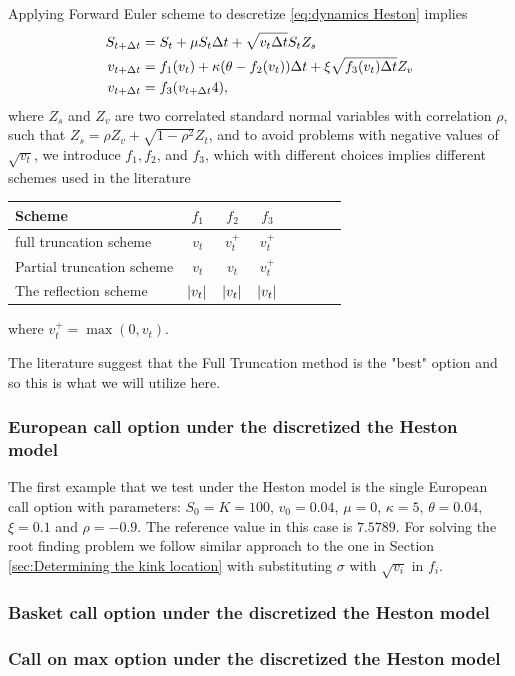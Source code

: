 Applying Forward Euler scheme to descretize \ref{eq:dynamics Heston} implies 
\begin{align}\label{eq:FE_Heston_discrete}
S_{t+\Delta t}&= S_t +\mu S_t \Delta t+\sqrt{v_t \Delta t}S_t Z_s \nonumber\\
v_{t+\Delta t}&=f_1(v_t)+\kappa (\theta-f_2(v_t)) \Delta t+\xi \sqrt{f_3(v_t) \Delta t} Z_v \nonumber\\
v_{t+\Delta t}&=f_3(v_{t+\Delta t}4) ,
\end{align}
where $Z_s$ and $Z_v$  are two correlated standard normal variables with correlation $\rho$, such that $Z_s=\rho Z_v+\sqrt{1-\rho^2} Z_t$, and to avoid problems with negative values of $\sqrt{v_t}$, we introduce $f_1, f_2$, and $f_3$, which with different choices implies different schemes used in the literature 

\FloatBarrier
\begin{table}[h!]
	\centering
	\begin{tabular}{l*{6}{c}r}
		\toprule[1.5pt]
	Scheme &  $f_1$& $f_2$  & $f_3$     \\
	\hline
	full truncation scheme & $v_t$ &  $v_t^+$&$v_t^+$\\
	Partial truncation scheme & $v_t$ &  $v_t$&$v_t^+$\\
	The reflection scheme  &$\left\lvert v_t\right\rvert$ & $\left\lvert v_t\right\rvert$& $\left\lvert v_t\right\rvert$\\
			\bottomrule[1.25pt]
	\end{tabular}
	\label{Numerical schemes for CIR process}
\end{table}
\FloatBarrier
where  $v_t^+=\max(0,v_t)$.

The literature \cite{lord2010comparison} suggest that the Full Truncation method is the "best" option and so this is what we will utilize here. 

\subsubsection{European call option  under the discretized the Heston model }

The  first example that we test under the Heston model is the single European call option with parameters: $S_0=K=100$, $v_0=0.04$, $\mu=0$, $\kappa=5$, $\theta=0.04$, $\xi=0.1$ and $\rho=-0.9$. The reference value in this case is $7.5789$. For solving the root finding problem we follow similar approach to the one in Section \ref{sec:Determining the kink location} with substituting $\sigma$ with $\sqrt{v_i}$ in $f_i$.


\subsubsection{Basket call option under the discretized the Heston model }

\subsubsection{Call on max option under the discretized the Heston model }

